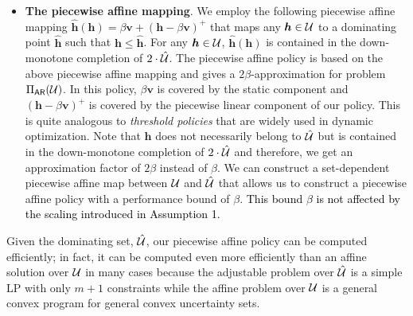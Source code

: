 \documentclass[11pt]{article}
\theoremstyle{plain}
\theoremstyle{definition}
\numberwithin{equation}{section}%
\numberwithin{equation}{section}%
\newcommand{\mb}[1]{\ensuremath{\boldsymbol{#1}}}
\newcommand*{\red}{\textcolor{black}}
\begin{document}
\begin{itemize}
\item[b)] {\bf The piecewise affine mapping}. We employ the following piecewise affine mapping $\mb{ \hat{h}}(\mb h) = \beta \mb v + \left( \mb h - \beta \mb v\right)^+$ that maps any $\mb h \in {\cal U}$ to a dominating point $\hat{\mb h}$ such that $\mb h \leq \hat{\mb h}$.
For any $\mb{h} \in {\cal U}$, $\mb{\hat h}(\mb{h})$ is contained in the down-monotone completion of $2 \cdot \hat{\cal U}$. The piecewise affine policy is based on the above piecewise affine mapping and gives a $2\beta$-approximation for problem $\Pi_{\sf AR}({\cal U})$. In this policy, $ \beta \mb v$ is covered by the static component and  $\left( \mb h - \beta \mb v\right)^+$ is covered by the piecewise linear component of our policy. This is quite analogous to {\em threshold policies} that are widely used in dynamic optimization.  Note that $\hat {\mb h}$ does not necessarily belong to $\hat{\cal U}$ but is contained in the down-monotone completion of $2 \cdot \hat{\cal U}$ and therefore, we get an approximation factor of $2 \beta$ instead of $\beta$. We can construct a set-dependent piecewise affine map between ${\cal U}$ and $\hat{\cal U}$ that allows us to construct a piecewise affine policy with a performance bound of $\beta$. \red{This bound $\beta$ is not affected by the scaling introduced in Assumption 1.}

\end{itemize}

Given the dominating set, $\hat{\cal U}$, our piecewise affine policy can be computed efficiently;  in fact, it can be computed even more efficiently than an affine solution over ${\cal U}$ in many cases because the adjustable problem over $\hat{\cal U}$ is a simple LP with only $m+1$ constraints while the affine problem over ${\cal U}$  is a general convex program for general convex uncertainty sets.

\end{document}
